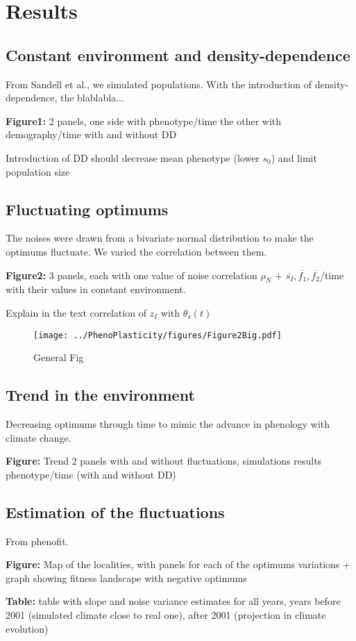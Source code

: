 \label{sec:Res}
\section*{Results}

\subsection*{Constant environment and density-dependence}

From Sandell et al., we simulated populations. With the introduction of density-dependence, the blablabla...

\textbf{Figure1:} 2 panels, one side with phenotype/time the other with demography/time with and without DD

Introduction of DD should decrease mean phenotype (lower $s_{0}$) and limit population size

\subsection*{Fluctuating optimums}

The noises were drawn from a bivariate normal distribution to make the optimums fluctuate. We varied the correlation between them.

\textbf{Figure2:} 3 panels, each with one value of noise correlation $\rho_{N}$ + $\overline{s_{I}}, \overline{f_{1}}, \overline{f_{2}}$/time with their values in constant environment.

Explain in the text correlation of $z_{I}$ with $\theta_{s}(t)$

\begin{figure}[ht]
	\centering
	\texttt{[image: ../PhenoPlasticity/figures/Figure2Big.pdf]}
	\caption{General Fig}
\end{figure}

\subsection*{Trend in the environment}

Decreasing optimums through time to mimic the advance in phenology with climate change.

\textbf{Figure:} Trend 2 panels with and without fluctuations, simulations results phenotype/time (with and without DD)

\subsection*{Estimation of the fluctuations}

From phenofit.

\textbf{Figure:} Map of the localities, with panels for each of the optimums variations + graph showing fitness landscape with negative optimums

\textbf{Table:} table with slope and noise variance estimates for all years, years before 2001 (simulated climate close to real one), after 2001 (projection in climate evolution)